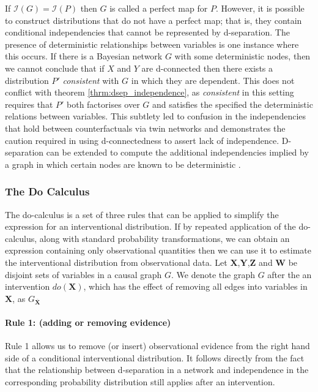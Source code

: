 \documentclass[11pt,a4paper,twoside]{report}
\newcommand{\indep}[1]{\mathcal{I}\left(#1\right)}
\theoremstyle{plain}
\theoremstyle{definition}
\begin{document}
If $\indep{G} = \indep{P}$ then $G$ is called a perfect map for $P$. However, it is possible to construct distributions that do not have a perfect map; that is, they contain conditional independencies that cannot be represented by d-separation. The presence of deterministic relationships between variables is one instance where this occurs. If there is a Bayesian network $G$ with some deterministic nodes, then we cannot conclude that if $X$ and $Y$ are d-connected then there exists a distribution $P'$ \emph{consistent} with $G$ in which they are dependent. This does not conflict with theorem \ref{thrm:dsep_independence}, as \emph{consistent} in this setting requires that $P'$ both factorises over $G$ and satisfies the specified the deterministic relations between variables. This subtlety led to confusion in the independencies that hold between counterfactuals via twin networks \citep{Pearl2000,Richardson2013} and demonstrates the caution required in using d-connectedness to assert lack of independence. D-separation can be extended to compute the additional independencies implied by a graph in which certain nodes are known to be deterministic \citep{Geiger1990}. 

\subsubsection{The Do Calculus} 
\label{sec:do_calculus}

The do-calculus is a set of three rules \citep{Pearl1995} that can be applied to simplify the expression for an interventional distribution. If by repeated application of the do-calculus, along with standard probability transformations, we can obtain an expression containing only observational quantities then we can use it to estimate the interventional distribution from observational data. Let $\boldsymbol{X}$,$\boldsymbol{Y}$,$\boldsymbol{Z}$ and $\boldsymbol{W}$ be disjoint sets of variables in a causal graph $G$. We denote the graph $G$ after the an intervention $do(\boldsymbol{X})$, which has the effect of removing all edges into variables in $\boldsymbol{X}$, as $G_{\overline{\boldsymbol{X}}}$

\paragraph{Rule 1: (adding or removing evidence)} 

Rule 1 allows us to remove (or insert) observational evidence from the right hand side of a conditional interventional distribution. It follows directly from the fact that the relationship between d-separation in a network and independence in the corresponding probability distribution still applies after an intervention. 
\end{document}
